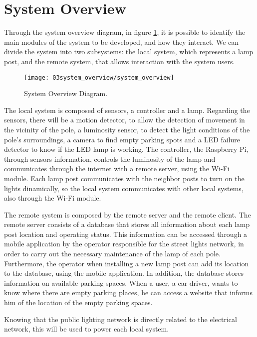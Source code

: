 \section{System Overview}
Through the system overview diagram, in figure \ref{fig:system_overview}, it is possible to identify the main modules of the system to be developed, and how they interact. We can divide the system into two subsystems: the local system, which represents a lamp post, and the remote system, that allows interaction with the system users.

\begin{figure}[ht]
	\centering
	\texttt{[image: 03system\_overview/system\_overview]}
	\caption{System Overview Diagram.}
	\label{fig:system_overview}
\end{figure}

The local system is composed of sensors, a controller and a lamp. Regarding the sensors, there will be a motion detector, to allow the detection of movement in the vicinity of the pole, a luminosity sensor, to detect the light conditions of the pole’s surroundings, a camera to find empty parking spots and a LED failure detector to know if the LED lamp is working. The controller, the Raspberry Pi, through sensors information, controls the luminosity of the lamp and communicates through the internet with a remote server, using the Wi-Fi module. Each lamp post communicates with the neighbor posts to turn on the lights dinamically, so the local system communicates with other local systems, also through the Wi-Fi module.

The remote system is composed by the remote server and the remote client. The remote server consists of a database that stores all information about each lamp post location and operating status. This information can be accessed through a mobile application by the operator  responsible for the street lights network, in order to carry out the necessary maintenance of the lamp of each pole. Furthermore, the operator when installing a new lamp post can add its location to the database, using the mobile application. In addition, the database stores information on available parking spaces. When a user, a car driver, wants to know where there are empty parking places, he can access a website that informs him of the location of the empty parking spaces.

Knowing that the public lighting network is directly related to the electrical network, this will be used to power each local system.

